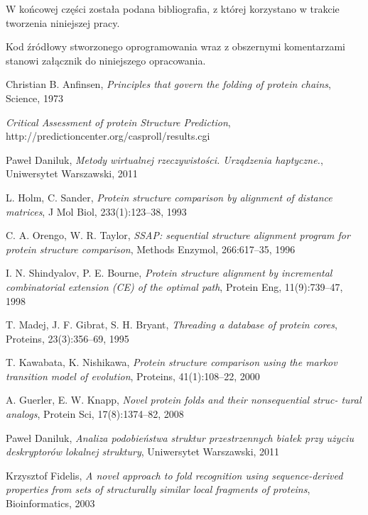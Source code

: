 \documentclass[licencjacka]{pracamgr}
\begin{document}
W końcowej części została podana bibliografia, z której korzystano w trakcie tworzenia niniejszej pracy. 

Kod źródłowy stworzonego oprogramowania wraz z obszernymi komentarzami stanowi załącznik do niniejszego opracowania.

\begin{thebibliography}{99}

 Christian B. Anfinsen, \textit{Principles that govern the folding of protein chains}, Science, 1973

 \textit{Critical Assessment of protein Structure Prediction}, http://predictioncenter.org/casproll/results.cgi

 Paweł Daniluk, \textit{Metody wirtualnej rzeczywistości. Urządzenia haptyczne.}, Uniwersytet Warszawski, 2011 

 L. Holm, C. Sander, \textit{Protein structure comparison by alignment of distance matrices}, J Mol Biol, 233(1):123–38, 1993

 C. A. Orengo, W. R. Taylor, \textit{SSAP: sequential structure alignment program
for protein structure comparison}, Methods Enzymol, 266:617–35, 1996

 I. N. Shindyalov, P. E. Bourne, \textit{Protein structure alignment by incremental
combinatorial extension (CE) of the optimal path}, Protein Eng, 11(9):739–47, 1998

 T. Madej, J. F. Gibrat, S. H. Bryant, \textit{Threading a database of protein cores},
Proteins, 23(3):356–69, 1995

 T. Kawabata, K. Nishikawa, \textit{Protein structure comparison using the markov
transition model of evolution}, Proteins, 41(1):108–22, 2000
 
 A. Guerler, E. W. Knapp, \textit{Novel protein folds and their nonsequential struc-
tural analogs}, Protein Sci, 17(8):1374–82, 2008

 Paweł Daniluk, \textit{Analiza podobieństwa struktur przestrzennych białek przy użyciu deskryptorów lokalnej struktury}, Uniwersytet Warszawski, 2011

 Krzysztof Fidelis, \textit{A novel approach to fold recognition using sequence-derived properties from sets of structurally similar local fragments of proteins}, Bioinformatics, 2003


\end{thebibliography}
\end{document}
